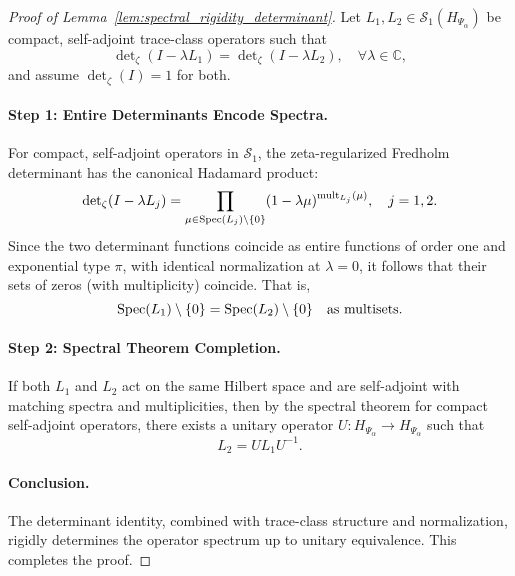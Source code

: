 \begin{proof}[Proof of Lemma~\ref{lem:spectral_rigidity_determinant}]
Let \( L_1, L_2 \in \mathcal{S}_1(H_{\Psi_\alpha}) \) be compact, self-adjoint trace-class operators such that
\[
\det\nolimits_\zeta(I - \lambda L_1) = \det\nolimits_\zeta(I - \lambda L_2), \quad \forall \lambda \in \mathbb{C},
\]
and assume \( \det\nolimits_\zeta(I) = 1 \) for both.

\paragraph{Step 1: Entire Determinants Encode Spectra.}
For compact, self-adjoint operators in \( \mathcal{S}_1 \), the zeta-regularized Fredholm determinant has the canonical Hadamard product:
\[
\det\nolimits_\zeta(I - \lambda L_j) = \prod_{\mu \in \operatorname{Spec}(L_j) \setminus \{0\}} (1 - \lambda \mu)^{\operatorname{mult}_{L_j}(\mu)},
\quad j = 1,2.
\]
Since the two determinant functions coincide as entire functions of order one and exponential type \( \pi \), with identical normalization at \( \lambda = 0 \), it follows that their sets of zeros (with multiplicity) coincide. That is,
\[
\operatorname{Spec}(L_1) \setminus \{0\} = \operatorname{Spec}(L_2) \setminus \{0\}
\quad \text{as multisets}.
\]

\paragraph{Step 2: Spectral Theorem Completion.}
If both \( L_1 \) and \( L_2 \) act on the same Hilbert space and are self-adjoint with matching spectra and multiplicities, then by the spectral theorem for compact self-adjoint operators, there exists a unitary operator \( U \colon H_{\Psi_\alpha} \to H_{\Psi_\alpha} \) such that
\[
L_2 = U L_1 U^{-1}.
\]

\paragraph{Conclusion.}
The determinant identity, combined with trace-class structure and normalization, rigidly determines the operator spectrum up to unitary equivalence. This completes the proof.
\end{proof}
% 